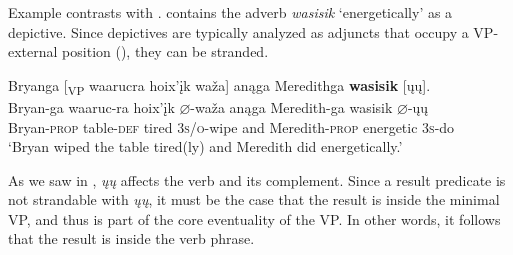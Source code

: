\documentclass[output=paper]{LSP/langsci}
\begin{document}
\begin{exe}
\ex\label{ex:rosen:24}
\begin{xlist}



\end{xlist}
\end{exe}

Example  contrasts with .   contains the adverb \emph{wasisik} `energetically' as a depictive. Since depictives are typically analyzed as adjuncts that occupy a VP-external position (\citealt{LevinRappaportHovav1995}), they can be stranded.

\begin{exe}

\ex\label{ex:rosen:25} \glll Bryanga [\textsubscript{VP} waarucra hoix'įk waža\textsc] anąga  Meredithga \textbf{wasisik} [ųų]. \\
 Bryan-ga {} waaruc-ra hoix'įk {$\varnothing$}-waža anąga Meredith-ga  wasisik {$\varnothing$}-ųų\\
Bryan-\textsc{prop} {} table-\textsc{def} tired \textsc{3s/o}-wipe and Meredith-\textsc{prop}  energetic \textsc{3s}-do\\
\glt `Bryan wiped the table tired(ly) and Meredith did energetically.'

\end{exe}

As we saw in , \textit{ųų} affects the verb and its complement. Since a result predicate is not strandable with \textit{ųų}, it must be the case that the result is inside the minimal VP, and thus is part of the core eventuality of the VP. In other words, it follows that the result is inside the verb phrase.
\end{document}
